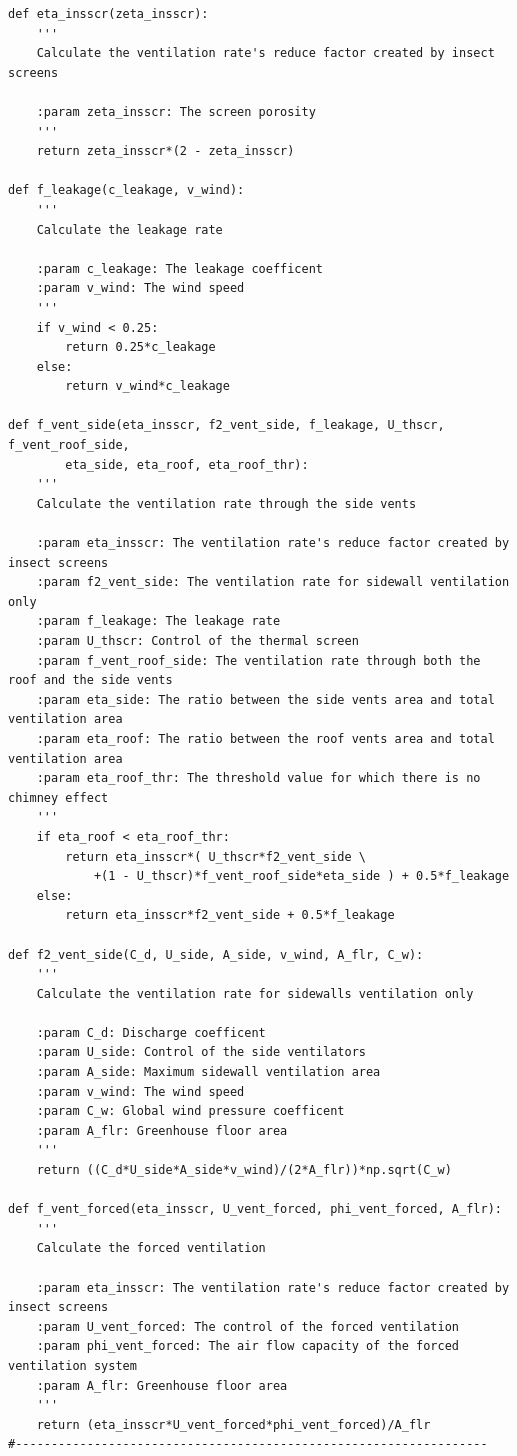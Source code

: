 \documentclass[a4paper]{article}
\begin{document}
\begin{appendices}
\begin{verbatim}
def eta_insscr(zeta_insscr):
    '''
    Calculate the ventilation rate's reduce factor created by insect screens

    :param zeta_insscr: The screen porosity
    '''
    return zeta_insscr*(2 - zeta_insscr)

def f_leakage(c_leakage, v_wind):
    '''
    Calculate the leakage rate

    :param c_leakage: The leakage coefficent
    :param v_wind: The wind speed
    '''
    if v_wind < 0.25:
        return 0.25*c_leakage
    else:
        return v_wind*c_leakage

def f_vent_side(eta_insscr, f2_vent_side, f_leakage, U_thscr, f_vent_roof_side,
        eta_side, eta_roof, eta_roof_thr):
    '''
    Calculate the ventilation rate through the side vents

    :param eta_insscr: The ventilation rate's reduce factor created by insect screens
    :param f2_vent_side: The ventilation rate for sidewall ventilation only
    :param f_leakage: The leakage rate
    :param U_thscr: Control of the thermal screen
    :param f_vent_roof_side: The ventilation rate through both the roof and the side vents
    :param eta_side: The ratio between the side vents area and total ventilation area
    :param eta_roof: The ratio between the roof vents area and total ventilation area
    :param eta_roof_thr: The threshold value for which there is no chimney effect
    '''
    if eta_roof < eta_roof_thr:
        return eta_insscr*( U_thscr*f2_vent_side \
            +(1 - U_thscr)*f_vent_roof_side*eta_side ) + 0.5*f_leakage
    else:
        return eta_insscr*f2_vent_side + 0.5*f_leakage

def f2_vent_side(C_d, U_side, A_side, v_wind, A_flr, C_w):
    '''
    Calculate the ventilation rate for sidewalls ventilation only

    :param C_d: Discharge coefficent
    :param U_side: Control of the side ventilators
    :param A_side: Maximum sidewall ventilation area
    :param v_wind: The wind speed
    :param C_w: Global wind pressure coefficent
    :param A_flr: Greenhouse floor area
    '''
    return ((C_d*U_side*A_side*v_wind)/(2*A_flr))*np.sqrt(C_w)

def f_vent_forced(eta_insscr, U_vent_forced, phi_vent_forced, A_flr):
    '''
    Calculate the forced ventilation

    :param eta_insscr: The ventilation rate's reduce factor created by insect screens
    :param U_vent_forced: The control of the forced ventilation
    :param phi_vent_forced: The air flow capacity of the forced ventilation system
    :param A_flr: Greenhouse floor area
    '''
    return (eta_insscr*U_vent_forced*phi_vent_forced)/A_flr
#------------------------------------------------------------------



\end{verbatim}
\end{appendices}
\end{document}
